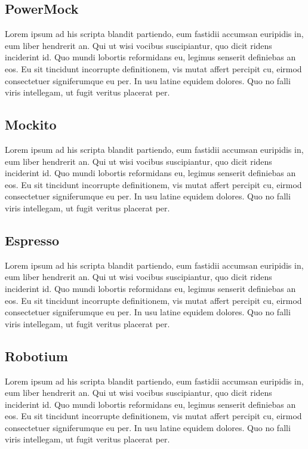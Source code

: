 \subsection{PowerMock}
Lorem ipsum ad his scripta blandit partiendo, eum fastidii accumsan euripidis in, eum liber hendrerit an. Qui ut wisi vocibus suscipiantur, quo dicit ridens inciderint id. Quo mundi lobortis reformidans eu, legimus senserit definiebas an eos. Eu sit tincidunt incorrupte definitionem, vis mutat affert percipit cu, eirmod consectetuer signiferumque eu per. In usu latine equidem dolores. Quo no falli viris intellegam, ut fugit veritus placerat per.

\subsection{Mockito}
Lorem ipsum ad his scripta blandit partiendo, eum fastidii accumsan euripidis in, eum liber hendrerit an. Qui ut wisi vocibus suscipiantur, quo dicit ridens inciderint id. Quo mundi lobortis reformidans eu, legimus senserit definiebas an eos. Eu sit tincidunt incorrupte definitionem, vis mutat affert percipit cu, eirmod consectetuer signiferumque eu per. In usu latine equidem dolores. Quo no falli viris intellegam, ut fugit veritus placerat per.

\subsection{Espresso}
Lorem ipsum ad his scripta blandit partiendo, eum fastidii accumsan euripidis in, eum liber hendrerit an. Qui ut wisi vocibus suscipiantur, quo dicit ridens inciderint id. Quo mundi lobortis reformidans eu, legimus senserit definiebas an eos. Eu sit tincidunt incorrupte definitionem, vis mutat affert percipit cu, eirmod consectetuer signiferumque eu per. In usu latine equidem dolores. Quo no falli viris intellegam, ut fugit veritus placerat per.

\subsection{Robotium}
Lorem ipsum ad his scripta blandit partiendo, eum fastidii accumsan euripidis in, eum liber hendrerit an. Qui ut wisi vocibus suscipiantur, quo dicit ridens inciderint id. Quo mundi lobortis reformidans eu, legimus senserit definiebas an eos. Eu sit tincidunt incorrupte definitionem, vis mutat affert percipit cu, eirmod consectetuer signiferumque eu per. In usu latine equidem dolores. Quo no falli viris intellegam, ut fugit veritus placerat per.

